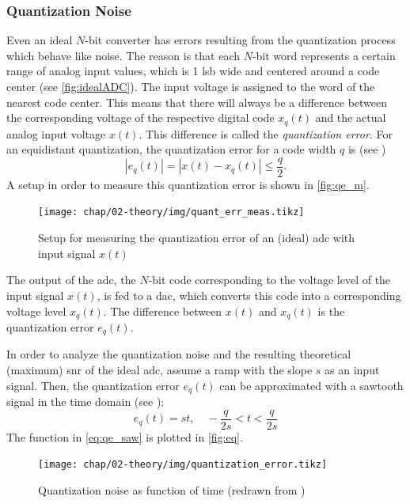 \subsubsection{Quantization Noise}\label{par:quant_noise}
Even an ideal $N$-bit converter has errors resulting from the quantization process which behave like noise. %
The reason is that each $N$-bit word represents a certain range of analog input values, which is 1 \gls{lsb} wide and centered around a code center (see \autoref{fig:idealADC}). \cite{Lundberg}
The input voltage is assigned to the word of the nearest code center.
This means that there will always be a difference between the corresponding voltage of the respective digital code $x_q(t)$ and the actual analog input voltage $x(t)$.
This difference is called the \textit{quantization error}. For an equidistant quantization, the quantization error for a code width $q$ is (see \cite{puente2015})
\begin{equation}
	\left| e_q(t) \right| = \left| x(t) - x_q(t) \right| \leq \frac{q}{2}.
\end{equation}
A setup in order to measure this quantization error is shown in \autoref{fig:qe_m}. 
\begin{figure}[tbh]
	\centering
	\texttt{[image: chap/02-theory/img/quant\_err\_meas.tikz]}
	\caption[Measurement setup for quantization error]{Setup for measuring the quantization error of an (ideal) \gls{adc} with input signal $x(t)$}
	\label{fig:qe_m}
\end{figure}

The output of the \gls{adc}, the $N$-bit code corresponding to the voltage level of the input signal $x(t)$, is fed to a \gls{dac}, which converts this code into a corresponding voltage level $x_q(t)$. 
The difference between $x(t)$ and $x_q(t)$ is the quantization error $e_q(t)$.

In order to analyze the quantization noise and the resulting theoretical (maximum) \gls{snr} of the ideal \gls{adc}, assume a ramp with the slope $s$ as an input signal. 
Then, the quantization error $e_q(t)$ can be approximated with a sawtooth signal in the time domain (see \cite{walt}): 
\begin{equation}\label{eq:qe_saw}
	e_q(t) = st, \quad -\frac{q}{2s} < t < \frac{q}{2s} 
\end{equation}
The function in \autoref{eq:qe_saw} is plotted in \autoref{fig:eq}.
\begin{figure}[tbh]
	\centering
	\texttt{[image: chap/02-theory/img/quantization\_error.tikz]}
	\caption{Quantization noise as function of time (redrawn from \cite{walt})}
	\label{fig:eq}
\end{figure}

